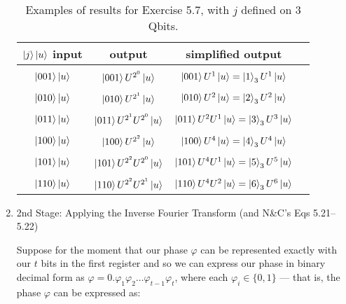 \documentclass{article}
\begin{document}
\begin{enumerate}[label=\textbf{(\arabic*)}]
\begin{table}[th]
    \captionsetup{font=small, width = 14cm}
    \centering
    \begin{tabular}{c|c|c|c}
        $\ket{j}\ket{u}$ input & output & simplified output\\
        \hline\hline
        &&\\[-5pt]
        $\ket{001}\ket{u}$
        & $\ket{001}U^{2^0}\ket{u}$
        & $\ket{001}U^{1}\ket{u} = \ket{1}_3 U^{1}\ket{u}$
        \\[5pt]
        \hline
        &&\\[-5pt]
        $\ket{010}\ket{u}$
        & $\ket{010}U^{2^1}\ket{u}$
        & $\ket{010}U^{2}\ket{u} = \ket{2}_3 U^{2}\ket{u}$
        \\[5pt]
        \hline
        &&\\[-5pt]
        $\ket{011}\ket{u}$
        & $\ket{011}U^{2^1}U^{2^0}\ket{u}$
        & $\ket{011}U^{2}U^{1}\ket{u} = \ket{3}_3 U^{3}\ket{u}$
        \\[5pt]
        \hline
        &&\\[-5pt]
        $\ket{100}\ket{u}$
        & $\ket{100}U^{2^2}\ket{u}$
        & $\ket{100}U^{4}\ket{u} = \ket{4}_3 U^{4}\ket{u}$
        \\[5pt]
        \hline
        &&\\[-5pt]
        $\ket{101}\ket{u}$
        & $\ket{101}U^{2^2}U^{2^0}\ket{u}$
        & $\ket{101}U^{4}U^{1}\ket{u} = \ket{5}_3 U^{5}\ket{u}$
        \\[5pt]
        \hline
        &&\\[-5pt]
        $\ket{110}\ket{u}$
        & $\ket{110}U^{2^2}U^{2^1}\ket{u}$
        & $\ket{110}U^{4}U^{2}\ket{u} = \ket{6}_3 U^{6}\ket{u}$
        \\[5pt]
        \hline
        \end{tabular}
    \caption{Examples of results for Exercise 5.7, with $j$ defined on 3 Qbits.}
    \label{table:Prob_5.7}
\end{table}


\item 2nd Stage: Applying the Inverse Fourier Transform (and N\&C's Eqs 5.21–5.22)

\vspace{0.1in}

Suppose for the moment that our phase $\varphi$ can be represented exactly with our $t$ bits in the first register and so we can express our phase in binary decimal form as $\varphi = 0.\varphi_1 \varphi_2 \ldots \varphi_{t-1}\varphi_{t}$, where each $\varphi_{i}\in\{0, 1\}$ --- that is, the phase $\varphi$ can be expressed as:


\end{enumerate}
\end{document}

